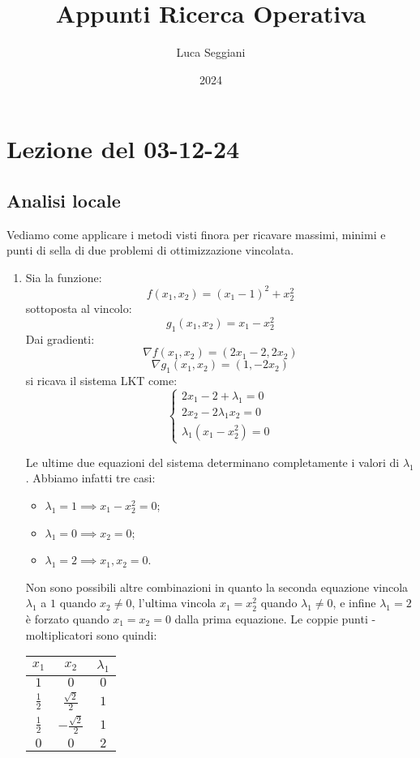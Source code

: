 \documentclass[a4paper,11pt]{article}
\title{Appunti Ricerca Operativa}
\author{Luca Seggiani}
\date{2024}
\begin{document}
\section{Lezione del 03-12-24}

\thispagestyle{empty}
\pagestyle{fancy}

\subsection{Analisi locale}
Vediamo come applicare i metodi visti finora per ricavare massimi, minimi e punti di sella di due problemi di ottimizzazione vincolata.
\begin{enumerate}
	\item Sia la funzione:
$$
f(x_1, x_2) = (x_1 - 1)^2 + x_2^2
$$
sottoposta al vincolo:
$$
g_1(x_1, x_2) = x_1 - x_2^2
$$
Dai gradienti:
$$
\nabla f(x_1, x_2) = (2x_1 - 2, 2x_2)
$$
$$
\nabla g_1(x_1, x_2) = (1, -2x_2)
$$
si ricava il sistema LKT come:
\[
	\begin{cases}
		2x_1 - 2 + \lambda_1 = 0 \\ 
		2x_2 - 2 \lambda_1 x_2 = 0 \\ 
		\lambda_1 (x_1 - x_2^2) = 0
	\end{cases}
\]

Le ultime due equazioni del sistema determinano completamente i valori di $\lambda_1$.
Abbiamo infatti tre casi:
\begin{itemize}
	\item $\lambda_1 = 1 \implies x_1 - x_2^2 = 0$;
	\item $\lambda_1 = 0 \implies x_2 = 0$;
	\item $\lambda_1 = 2 \implies x_1, x_2 = 0$.
\end{itemize}
Non sono possibili altre combinazioni in quanto la seconda equazione vincola $\lambda_1$ a $1$ quando $x_2 \neq 0$, l'ultima vincola $x_1 = x_2^2$ quando $\lambda_1 \neq 0$, e infine $\lambda_1 = 2$ è forzato quando $x_1 = x_2= 0$ dalla prima equazione.
Le coppie punti - moltiplicatori sono quindi:
\begin{table}[h!]
	\center 
	\begin{tabular} { c c | c }
		$x_1$ & $x_2$ & $\lambda_1$ \\
		\hline 
		$1$ & $0$ & $0$ \\ 
		$\frac{1}{2}$ & $\frac{\sqrt{2}}{2}$ & $1$ \\ 
		$\frac{1}{2}$ & $-\frac{\sqrt{2}}{2}$ & $1$ \\ 
		$0$ & $0$ & $2$
	\end{tabular}
\end{table}


\end{enumerate}
\end{document}
